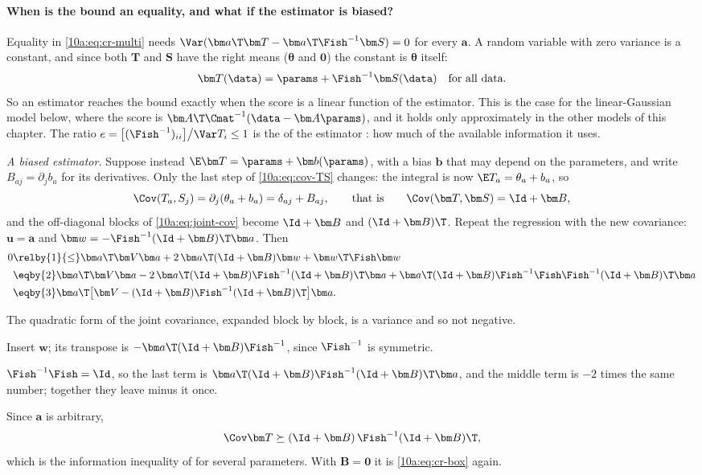 \paragraph{When is the bound an equality, and what if the estimator is biased?} Equality in \eqref{10a:eq:cr-multi}
needs $\Var(\bm a\T\bm T-\bm a\T\Fish^{-1}\bm S)=0$ for every $\bm a$. A random variable with zero variance is a
constant, and since both $\bm T$ and $\bm S$ have the right means ($\bm\theta$ and $\bm0$) the constant is $\bm\theta$ itself:
\[
  \bm T(\data)=\params+\Fish^{-1}\bm S(\data)\quad\text{for all data.}
\]
So an estimator reaches the bound exactly when the score is a linear function of the estimator. This is the case
for the linear-Gaussian model below, where the score is $\bm A\T\Cmat^{-1}(\data-\bm A\params)$, and it holds only
approximately in the other models of this chapter. The ratio
$e=\bigl[(\Fish^{-1})_{ii}\bigr]\big/\Var T_i\le1$ is the  of the estimator :
how much of the available information it uses.

\emph{A biased estimator.} Suppose instead $\E\bm T=\params+\bm b(\params)$, with a bias $\bm b$ that may depend on the
parameters, and write $B_{aj}=\partial_jb_a$ for its derivatives. Only the last step of \eqref{10a:eq:cov-TS}
changes: the integral is now $\E T_a=\theta_a+b_a$, so
\[
  \Cov(T_a,S_j)=\partial_j(\theta_a+b_a)=\delta_{aj}+B_{aj},
  \qquad\text{that is}\qquad \Cov(\bm T,\bm S)=\Id+\bm B ,
\]
and the off-diagonal blocks of \eqref{10a:eq:joint-cov} become $\Id+\bm B$ and $(\Id+\bm B)\T$. Repeat the
regression with the new covariance: $\bm u=\bm a$ and $\bm w=-\Fish^{-1}(\Id+\bm B)\T\bm a$. Then
\begin{align*}
  0&\relby{1}{\le}\bm a\T\bm V\bm a+2\,\bm a\T(\Id+\bm B)\bm w+\bm w\T\Fish\bm w
  \\
  &\eqby{2}\bm a\T\bm V\bm a-2\,\bm a\T(\Id+\bm B)\Fish^{-1}(\Id+\bm B)\T\bm a
    +\bm a\T(\Id+\bm B)\Fish^{-1}\Fish\Fish^{-1}(\Id+\bm B)\T\bm a
  \\
  &\eqby{3}\bm a\T\bigl[\bm V-(\Id+\bm B)\Fish^{-1}(\Id+\bm B)\T\bigr]\bm a .
\end{align*}
\begin{explain}
  \item The quadratic form of the joint covariance, expanded block by block, is a variance and so not negative.
  \item Insert $\bm w$; its transpose is $-\bm a\T(\Id+\bm B)\Fish^{-1}$, since $\Fish^{-1}$ is symmetric.
  \item $\Fish^{-1}\Fish=\Id$, so the last term is $\bm a\T(\Id+\bm B)\Fish^{-1}(\Id+\bm B)\T\bm a$, and the middle term is
        $-2$ times the same number; together they leave minus it once.
\end{explain}
Since $\bm a$ is arbitrary,
\begin{equation}
  \Cov\bm T\succeq(\Id+\bm B)\,\Fish^{-1}(\Id+\bm B)\T ,
  \label{10a:eq:cr-bias}
\end{equation}
which is the information inequality of  for several parameters. With $\bm B=\bm0$ it is
\eqref{10a:eq:cr-box} again.

